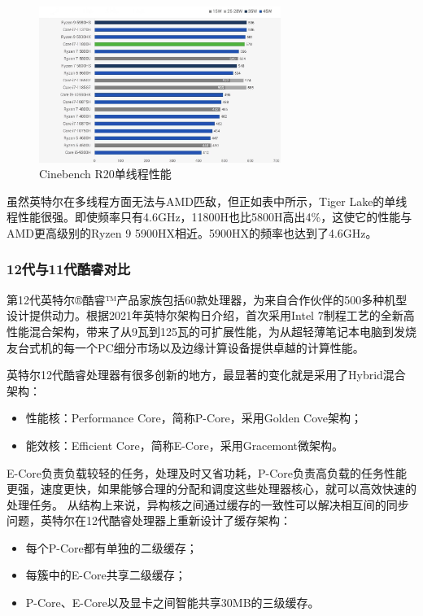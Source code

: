 \documentclass[a4paper]{article}
\begin{document}
\begin{figure}[H] %
\centering %
\includegraphics[width=0.7\textwidth]{单} %
\caption{Cinebench R20单线程性能} %
\label{Fig.main2} %
\end{figure}

虽然英特尔在多线程方面无法与AMD匹敌，但正如表中所示，Tiger Lake的单线程性能很强。即使频率只有4.6GHz，11800H也比5800H高出4\%，这使它的性能与AMD更高级别的Ryzen 9 5900HX相近。5900HX的频率也达到了4.6GHz。

\subsubsection{12代与11代酷睿对比}

第12代英特尔®酷睿™产品家族包括60款处理器，为来自合作伙伴的500多种机型设计提供动力。根据2021年英特尔架构日介绍，首次采用Intel 7制程工艺的全新高性能混合架构，带来了从9瓦到125瓦的可扩展性能，为从超轻薄笔记本电脑到发烧友台式机的每一个PC细分市场以及边缘计算设备提供卓越的计算性能。

英特尔12代酷睿处理器有很多创新的地方，最显著的变化就是采用了Hybrid混合架构：
\begin{itemize}
  \item 性能核：Performance Core，简称P-Core，采用Golden Cove架构；
  \item 能效核：Efficient Core，简称E-Core，采用Gracemont微架构。
\end{itemize}

E-Core负责负载较轻的任务，处理及时又省功耗，P-Core负责高负载的任务性能更强，速度更快，如果能够合理的分配和调度这些处理器核心，就可以高效快速的处理任务。
从结构上来说，异构核之间通过缓存的一致性可以解决相互间的同步问题，英特尔在12代酷睿处理器上重新设计了缓存架构：
\begin{itemize}
  \item 每个P-Core都有单独的二级缓存；
  \item 每簇中的E-Core共享二级缓存；
  \item P-Core、E-Core以及显卡之间智能共享30MB的三级缓存。
\end{itemize}
\end{document}
